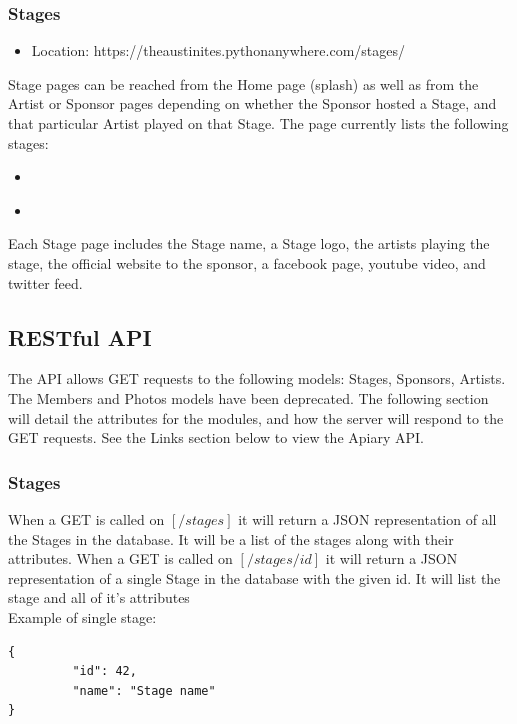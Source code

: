 \documentclass[12pt,english]{scrartcl}
\begin{document}
\subsubsection{Stages}

\begin{itemize}
 \item Location: https://theaustinites.pythonanywhere.com/stages/
\end{itemize}

Stage pages can be reached from the Home page (splash) as well as from the Artist or Sponsor pages depending on whether the Sponsor hosted a
Stage, and that particular Artist played on that Stage. The page currently lists the following stages:
\begin{itemize}
 \item 
\end{itemize}
\begin{itemize}
 \item 
\end{itemize}
Each Stage page includes the Stage name, a Stage logo, the artists playing the stage, the official website to the sponsor,
a facebook page, youtube video, and twitter feed.

\subsection{RESTful  API}
The API allows GET requests to the following models: Stages, Sponsors, Artists. The  Members and  Photos models have been deprecated.
The following section will detail the attributes for the modules, and how the server will respond to the GET requests. See 
the Links section below to view the Apiary API.

\subsubsection{Stages}
When a GET is called on $[/stages]$ it will return a JSON representation of all the Stages in the database.  It will be a list of the stages along with their attributes.
When a GET is called on $[/stages/{id}]$ it will return a JSON representation of a single Stage in the database with the given id.  It will list the stage and all of it's attributes
\\
Example of single stage:
\begin{verbatim}
{
         "id": 42,
         "name": "Stage name"
}
\end{verbatim}
\end{document}
